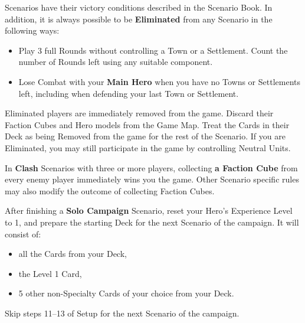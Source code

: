 
\begin{multicols*}{2}

 Scenarios have their victory conditions described in the Scenario Book.
In addition, it is always possible to be \textbf{Eliminated} from any Scenario in the following ways:
\begin{itemize}
  \item Play 3 full Rounds without controlling a Town or a Settlement.
    Count the number of Rounds left using any suitable component.
  \item Lose Combat with your \textbf{Main Hero} when you have no Towns or Settlements left, including when defending your last Town or Settlement.
\end{itemize}
Eliminated players are immediately removed from the game.
Discard their Faction Cubes and Hero models from the Game Map.
Treat the Cards in their Deck as being Removed from the game for the rest of the Scenario.
If you are Eliminated, you may still participate in the game by controlling Neutral Units.\par
{}\par

In \textbf{Clash} Scenarios with three or more players, collecting \textbf{a Faction Cube} from every enemy player immediately wins you the game.
Other Scenario specific rules may also modify the outcome of collecting Faction Cubes.

\columnbreak

After finishing a \textbf{Solo Campaign} Scenario, reset your Hero's Experience Level to 1, and prepare the starting Deck for the next Scenario of the campaign.
It will consist of:
\begin{itemize}
  \item all the  Cards from your Deck,
  \item the Level 1  Card,
  \item 5 other non-Specialty Cards of your choice from your Deck.
\end{itemize}
Skip steps 11--13 of Setup for the next Scenario of the campaign.

\vspace*{\fill}
\hspace{-3em}
{}

\end{multicols*}
